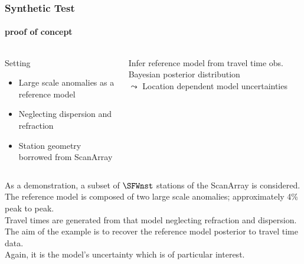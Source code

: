 \documentclass[aspectratio=169, t, 10pt,
    ]{beamer}
\begin{document}
\begin{frame}
    \frametitle{Synthetic Test}
    \framesubtitle{proof of concept}%
%
\begin{columns}%
%
%

    \begin{exampleblock}{Setting}
        \begin{itemize}
            \item Large scale anomalies as a reference model
            \item Neglecting dispersion and refraction
            \item Station geometry borrowed from ScanArray
        \end{itemize}
    \end{exampleblock}
    \medskip

    \begin{alertblock}{Infer reference model from travel time obs.}
        Bayesian posterior distribution \\
        \hfill {\large $\leadsto$} Location dependent model uncertainties ~
    \end{alertblock}

    \vspace{-10mm}
    
\end{columns}

\end{frame}

As a demonstration, a subset of $\SFWnst$ stations of the ScanArray is considered.
\\
The reference model is composed of two large scale anomalies; approximately 4\% peak to peak.
\\
Travel times are generated from that model neglecting refraction and dispersion.
\\
The aim of the example is to recover the reference model posterior to travel time data.
\\
Again, it is the model's uncertainty which is of particular interest.
\end{document}

